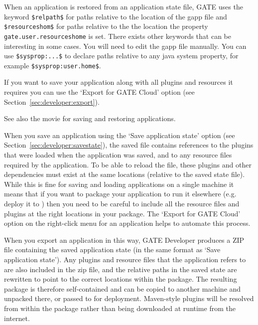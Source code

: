 When an application is restored from an application state file, 
GATE uses the keyword \verb=$relpath$= for paths relative to the location of the
gapp file 
and \verb=$resourceshom$= for paths relative to the the location the property
\texttt{gate.user.resourceshome} is set. 
There exists other keywords that can be interesting in some
cases. You will need to edit the gapp file manually. You can use
\verb=$sysprop:...$= to declare paths relative to any java
system property, for example \verb=$sysprop:user.home$=.

If you want to save your application along with all plugins and resources it
requires you can use the `Export for GATE Cloud' option (see
Section~\ref{sec:developer:export}).

See also the 
{movie for saving and restoring applications}.


When you save an application using the `Save application state' option
(see Section~\ref{sec:developer:savestate}), the saved file contains references
to the plugins that were loaded when the application was saved, and to any
resource files required by the application.  To be able to reload the file,
these plugins and other dependencies must exist at the same locations
(relative to the saved state file).  While this is fine for saving and
loading applications on a single machine it means that if you want to
package your application to run it elsewhere (e.g. deploy it to 
) then
you need to be careful to include all the resource files and plugins at the
right locations in your package.  The `Export for GATE Cloud' option on the
right-click menu for an application helps to automate this process.

When you export an application in this way, GATE Developer produces a
ZIP file containing the saved application state (in the same format as
`Save application state').  Any plugins and resource files that the
application refers to are also included in the zip file, and the
relative paths in the saved state are rewritten to point to the
correct locations within the package.  The resulting package is
therefore self-contained and can be copied to another machine and
unpacked there, or passed to
 for deployment.
Maven-style plugins will be resolved from within the package rather than
being downloaded at runtime from the internet.

